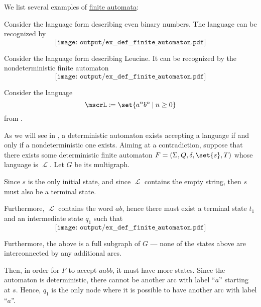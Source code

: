 \begin{example}\label{ex:def:finite_automaton}
  We list several examples of \hyperref[def:finite_automaton]{finite automata}:
  \begin{thmenum}
     Consider the language form  describing even binary numbers. The language can be recognized by
    \begin{equation*}
      \texttt{[image: output/ex\_\_def\_\_finite\_automaton.pdf]}
    \end{equation*}

     Consider the language form  describing Leucine. It can be recognized by the nondeterministic finite automaton
    \begin{equation*}
      \texttt{[image: output/ex\_\_def\_\_finite\_automaton.pdf]}
    \end{equation*}

     Consider the language
    \begin{equation*}
      \mscrL \coloneqq \set{ a^n b^n \given n \geq 0 }
    \end{equation*}
    from .

    As we will see in , a deterministic automaton exists accepting a language if and only if a nondeterministic one exists. Aiming at a contradiction, suppose that there exists some deterministic finite automaton \( F = (\Sigma, Q, \delta, \set{ s }, T) \) whose language is \( \mscrL \). Let \( G \) be its multigraph.

    Since \( s \) is the only initial state, and since \( \mscrL \) contains the empty string, then \( s \) must also be a terminal state.

    Furthermore, \( \mscrL \) contains the word \( ab \), hence there must exist a terminal state \( t_1 \) and an intermediate state \( q_1 \) such that
    \begin{equation*}
      \texttt{[image: output/ex\_\_def\_\_finite\_automaton.pdf]}
    \end{equation*}

    Furthermore, the above is a full subgraph of \( G \) --- none of the states above are interconnected by any additional arcs.

    Then, in order for \( F \) to accept \( aabb \), it must have more states. Since the automaton is deterministic, there cannot be another arc with label \enquote{\( a \)} starting at \( s \). Hence, \( q_1 \) is the only node where it is possible to have another arc with label \enquote{\( a \)}.


\end{thmenum}
\end{example}
